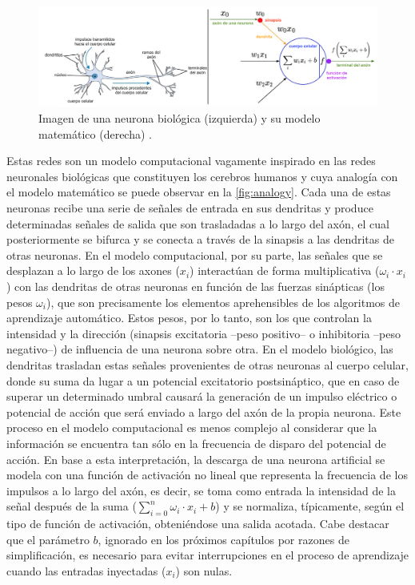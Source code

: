 \begin{figure}
    \centering
    \includegraphics[width=\textwidth]{Images/analogy-neuron.png}
    \caption{Imagen de una neurona biológica (izquierda) y su modelo matemático (derecha) \cite{CS231n}.}
    \label{fig:analogy}
\end{figure}

Estas redes son un modelo computacional vagamente inspirado en las redes neuronales biológicas que constituyen los cerebros humanos \cite{ANN} y cuya analogía con el modelo matemático se puede observar en la \autoref{fig:analogy}. Cada una de estas neuronas recibe una serie de señales de entrada en sus dendritas y produce determinadas señales de salida que son trasladadas a lo largo del axón, el cual posteriormente se bifurca y se conecta a través de la sinapsis a las dendritas de otras neuronas. En el modelo computacional, por su parte, las señales que se desplazan a lo largo de los axones ($x_i$) interactúan de forma multiplicativa ($\omega_i\cdot x_i$) con las dendritas de otras neuronas en función de las fuerzas sinápticas (los pesos $\omega_i$), que son precisamente los elementos aprehensibles de los algoritmos de aprendizaje automático.  Estos pesos, por lo tanto, son los que controlan la intensidad y la dirección (sinapsis excitatoria --peso positivo-- o inhibitoria --peso negativo--) de influencia de una neurona sobre otra. En el modelo biológico, las dendritas trasladan estas señales provenientes de otras neuronas al cuerpo celular, donde su suma da lugar a un potencial excitatorio postsináptico, que en caso de superar un determinado umbral causará la generación de un impulso eléctrico o potencial de acción que será enviado a largo del axón de la propia neurona. Este proceso en el modelo computacional es menos complejo al considerar que la información se encuentra tan sólo en la frecuencia de disparo del potencial de acción. En base a esta interpretación, la descarga de una neurona artificial se modela con una función de activación no lineal que representa la frecuencia de los impulsos a lo largo del axón, es decir, se toma como entrada la intensidad de la señal después de la suma ($\sum\limits_{i=0}^n \omega_i\cdot x_i + b$) y se normaliza, típicamente, según el tipo de función de activación, obteniéndose una salida acotada. Cabe destacar que el parámetro $b$, ignorado en los próximos capítulos por razones de simplificación, es necesario para evitar interrupciones en el proceso de aprendizaje cuando las entradas inyectadas ($x_i$) son nulas.

